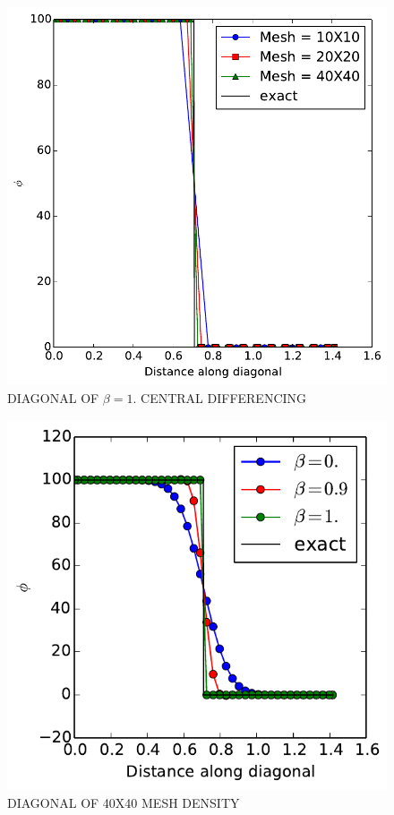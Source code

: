 \documentclass[cleanfoot,cleanhead,twocolumn,10pt,notitlepage]{asme2e}
\begin{document}
\begin{figure}[t]
\begin{center}
    \includegraphics[width=\linewidth]{../Project2_code/Beta/Beta1/lines.pdf}
    \caption{DIAGONAL OF $\beta=1.$ CENTRAL DIFFERENCING}
    \label{fig:be1}
\end{center}
\end{figure}

\begin{figure}[t]
\begin{center}
    \includegraphics[width=\linewidth]{../Project2_code/Mesh/Mesh_40/lines.pdf}
    \caption{DIAGONAL OF 40X40 MESH DENSITY}
    \label{fig:40X40}
\end{center}
\end{figure}
\end{document}
